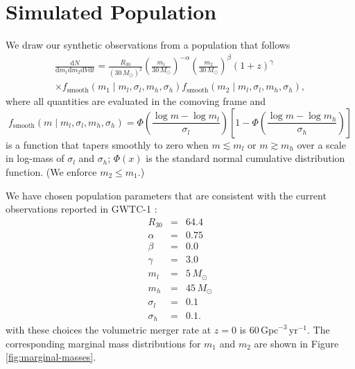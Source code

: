 \documentclass[modern]{aastex62}
\newcommand{\dd}{\mathrm{d}}
\newcommand{\diff}[2]{\frac{\dd #1}{\dd #2}}
\newcommand{\fsm}{f_{\mathrm{smooth}}}
\newcommand{\MSun}{M_\odot}
\newcommand{\perGpcyr}{\mathrm{Gpc}^{-3} \, \mathrm{yr}^{-1}}
\begin{document}


\appendix

\setcounter{figure}{0}
\renewcommand{\figurename}{Extended Data Figure}
\renewcommand{\tablename}{Extended Data Table}

\section{Simulated Population}
\label{sec:simulated-population}

We draw our synthetic observations from a population that follows
%
\begin{multline}
  \label{eq:population}
  \diff{N}{m_1 \dd m_2 \dd V \dd t} = \frac{R_{30}}{\left( 30 \, \MSun \right)^2} \left( \frac{m_1}{30 \, \MSun} \right)^{-\alpha} \left( \frac{m_2}{30 \, \MSun} \right)^{\beta} \left( 1 + z \right)^{\gamma} \\ \times \fsm\left( m_1 \mid m_l, \sigma_l, m_h, \sigma_h \right) \fsm\left( m_2 \mid m_l, \sigma_l, m_h, \sigma_h \right),
\end{multline}
%
where all quantities are evaluated in the comoving frame and
%
\begin{equation}
  \label{eq:smooth}
  \fsm\left( m \mid m_l, \sigma_l, m_h, \sigma_h \right) = \Phi\left( \frac{\log m - \log m_l}{\sigma_l} \right) \left[ 1 - \Phi\left( \frac{\log m - \log m_h}{\sigma_h} \right) \right]
\end{equation}
%
is a function that tapers smoothly to zero when $m \lesssim m_l$ or $m \gtrsim
m_h$ over a scale in log-mass of $\sigma_l$ and $\sigma_h$; $\Phi(x)$ is the
standard normal cumulative distribution function.  (We enforce $m_2 \leq m_1$.)

We have chosen population parameters that are consistent with the current
observations reported in GWTC-1 \citep{GWTC-1,O1O2Population}:
%
\begin{eqnarray}
  \label{eq:parameters}
  R_{30} & = & 64.4 \\
  \alpha & = & 0.75 \\
  \beta & = & 0.0 \\
  \gamma & = & 3.0 \\
  m_l & = & 5 \, \MSun \\
  m_h & = & 45 \, \MSun \\
  \sigma_l & = & 0.1 \\
  \sigma_h & = & 0.1.
\end{eqnarray}
%
with these choices the volumetric merger rate at $z = 0$ is $60 \, \perGpcyr$.
The corresponding marginal mass distributions for $m_1$ and $m_2$ are shown in
Figure \ref{fig:marginal-masses}.
\end{document}
